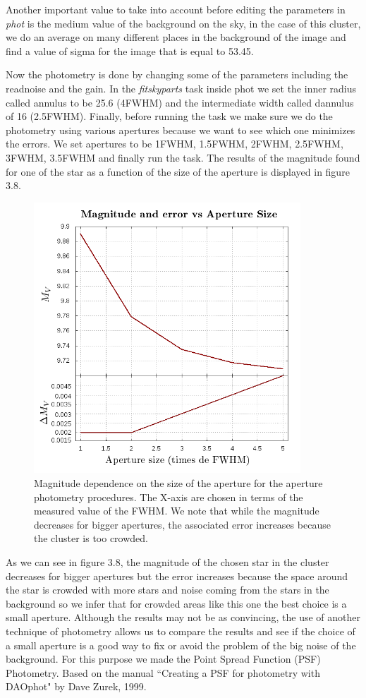 Another important value to take into account before editing the parameters in \textit{phot} is the medium value of the background on the sky, in the case of this cluster, we do an average on many different places in the background of the image and find a value of sigma for the image that is equal to 53.45.

Now the photometry is done by changing some of the parameters including the readnoise and the gain. In the \textit{fitskyparts} task inside phot we set the inner radius called annulus to be 25.6 (4FWHM) and the intermediate width called dannulus of 16 (2.5FWHM). Finally, before running the task we make sure we do the photometry using various apertures because we want to see which one minimizes the errors. We set apertures to be 1FWHM, 1.5FWHM, 2FWHM, 2.5FWHM, 3FWHM, 3.5FWHM and finally run the task. The results of the magnitude found for one of the star as a function of the size of the aperture is displayed in figure 3.8.

\begin{figure}[H]
\centering
\includegraphics[width=10cm]{images/aperture_size.png}
\caption[Photometry results of Magnitudes vs Size of apertures]{Magnitude dependence on the size of the aperture for the aperture photometry procedures. The X-axis are chosen in terms of the measured value of the FWHM. We note that while the magnitude decreases for bigger apertures, the associated error increases because the cluster is too crowded.}
\end{figure}

As we can see in figure 3.8, the magnitude of the chosen star in the cluster decreases for bigger apertures but the error increases because the space around the star is crowded with more stars and noise coming from the stars in the background so we infer that for crowded areas like this one the best choice is a small aperture. Although the results may not be as convincing, the use of another technique of photometry allows us to compare the results and see if the choice of a small aperture is a good way to fix or avoid the problem of the big noise of the background. For this purpose we made the Point Spread Function (PSF) Photometry. Based on the manual ``Creating a PSF for photometry with DAOphot" by Dave Zurek, 1999.

